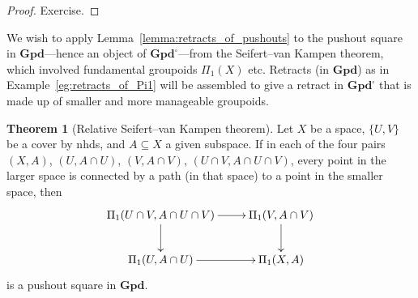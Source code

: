 \documentclass{tufte-handout}
\def\Gpd {\mathbf{Gpd}}
\theoremstyle{definition}
\newtheorem{theorem}{Theorem}
\begin{document}
\begin{proof}
Exercise.
\end{proof}

We wish to apply Lemma~\ref{lemma:retracts_of_pushouts} to the pushout square in 
$\Gpd$---hence an object of $\Gpd^\square$---from the Seifert--van Kampen theorem, which 
involved fundamental groupoids $\Pi_1(X)$ etc. Retracts (in $\Gpd$) as in 
Example~\ref{eg:retracts_of_Pi1} will be assembled to give a retract in $\Gpd^\square$ that
is made up of smaller and more manageable groupoids.

\begin{theorem}[Relative Seifert--van Kampen theorem]
Let $X$ be a space, $\{U,V\}$ be a cover by nhds, and $A\subseteq X$ a given subspace. 
If in each of the four pairs $(X,A)$, $(U,A\cap U)$, $(V,A\cap V)$, $(U\cap V,A\cap 
U\cap V)$, every point in the larger space is connected by a path (in that space) to a point in 
the smaller space, then
\[
\xymatrix{
	\Pi_1(U\cap V,A\cap U\cap V) \ar[r] \ar[d] & \Pi_1(V,A\cap V)\ar[d]\\
	\Pi_1(U,A\cap U) \ar[r] & \Pi_1(X,A)
}
\]
is a pushout square in $\Gpd$.
\end{theorem}
\end{document}
